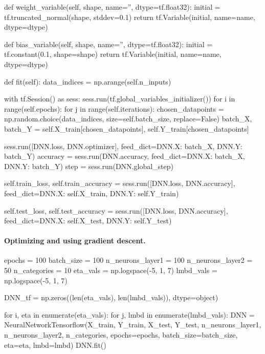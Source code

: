 \documentclass[%
oneside,                 %
final,                   %
10pt]{article}
\begin{document}
    def weight_variable(self, shape, name='', dtype=tf.float32):
        initial = tf.truncated_normal(shape, stddev=0.1)
        return tf.Variable(initial, name=name, dtype=dtype)
    
    def bias_variable(self, shape, name='', dtype=tf.float32):
        initial = tf.constant(0.1, shape=shape)
        return tf.Variable(initial, name=name, dtype=dtype)
    
    def fit(self):
        data_indices = np.arange(self.n_inputs)

        with tf.Session() as sess:
            sess.run(tf.global_variables_initializer())
            for i in range(self.epochs):
                for j in range(self.iterations):
                    chosen_datapoints = np.random.choice(data_indices, size=self.batch_size, replace=False)
                    batch_X, batch_Y = self.X_train[chosen_datapoints], self.Y_train[chosen_datapoints]
            
                    sess.run([DNN.loss, DNN.optimizer],
                        feed_dict={DNN.X: batch_X,
                                   DNN.Y: batch_Y})
                    accuracy = sess.run(DNN.accuracy,
                        feed_dict={DNN.X: batch_X,
                                   DNN.Y: batch_Y})
                    step = sess.run(DNN.global_step)
    
            self.train_loss, self.train_accuracy = sess.run([DNN.loss, DNN.accuracy],
                feed_dict={DNN.X: self.X_train,
                           DNN.Y: self.Y_train})
        
            self.test_loss, self.test_accuracy = sess.run([DNN.loss, DNN.accuracy],
                feed_dict={DNN.X: self.X_test,
                           DNN.Y: self.Y_test})
\epycod


\paragraph{Optimizing and using gradient descent.}
\bpycod
epochs = 100
batch_size = 100
n_neurons_layer1 = 100
n_neurons_layer2 = 50
n_categories = 10
eta_vals = np.logspace(-5, 1, 7)
lmbd_vals = np.logspace(-5, 1, 7)
\epycod


\bpycod
DNN_tf = np.zeros((len(eta_vals), len(lmbd_vals)), dtype=object)
        
for i, eta in enumerate(eta_vals):
    for j, lmbd in enumerate(lmbd_vals):
        DNN = NeuralNetworkTensorflow(X_train, Y_train, X_test, Y_test,
                                      n_neurons_layer1, n_neurons_layer2, n_categories,
                                      epochs=epochs, batch_size=batch_size, eta=eta, lmbd=lmbd)
        DNN.fit()
        
\end{document}
